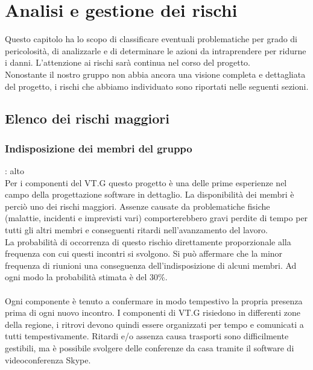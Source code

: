 \chapter{Analisi e gestione dei rischi}
\thispagestyle{fancy}

Questo capitolo ha lo scopo di classificare eventuali problematiche per grado
di pericolosit\`a, di analizzarle e di determinare le azioni da intraprendere per
ridurne i danni. L'attenzione ai rischi sar\`a continua nel corso del
progetto.\\ 
Nonostante il nostro gruppo non abbia ancora una visione completa e dettagliata del 
progetto, i rischi che abbiamo individuato sono riportati nelle seguenti sezioni.

\section{Elenco dei rischi maggiori}

\subsection{Indisposizione dei membri del gruppo}
: alto\\
Per i componenti del VT.G questo progetto \`e una delle prime esperienze nel campo della progettazione software in dettaglio. 
La disponibilit\`a dei membri \`e perci\`o uno dei rischi maggiori. 
Assenze causate da problematiche fisiche (malattie, incidenti e imprevisti vari) comporterebbero gravi perdite 
di tempo per tutti gli altri membri e conseguenti ritardi nell'avanzamento del
lavoro.\\
La probabilit\`a di occorrenza di questo rischio direttamente proporzionale alla
frequenza con cui questi incontri si svolgono. 
Si pu\`o affermare che la minor frequenza di riunioni  una conseguenza dell'indisposizione di alcuni membri.
Ad ogni modo la probabilit\`a stimata \`e del 30\%.\\
\\
Ogni componente \`e tenuto a confermare in modo tempestivo la propria presenza
prima di ogni nuovo incontro. I componenti di VT.G risiedono in differenti zone
della regione, i ritrovi devono quindi essere organizzati per tempo e comunicati
a tutti tempestivamente. Ritardi e/o assenza causa trasporti sono difficilmente
gestibili, ma \`e possibile svolgere delle conferenze da casa tramite il
software di videoconferenza Skype.

